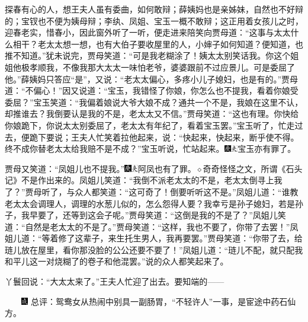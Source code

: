 探春有心的人，想王夫人虽有委曲，如何敢辩；薛姨妈也是亲姊妹，自然也不好辩的；宝钗也不便为姨母辩；李纨、凤姐、宝玉一概不敢辩；这正用着女孩儿之时，迎春老实，惜春小，因此窗外听了一听，便走进来陪笑向贾母道：“这事与太太什么相干？老太太想一想，也有大伯子要收屋里的人，小婶子如何知道？便知道，也推不知道。”犹未说完，贾母笑道：“可是我老糊涂了！姨太太别笑话我。你这个姐姐他极孝顺我，不像我那大太太一味怕老爷，婆婆跟前不过应景儿。可是委屈了他。”薛姨妈只答应“是”，又说：“老太太偏心，多疼小儿子媳妇，也是有的。”贾母道：“不偏心！”因又说道：“宝玉，我错怪了你娘，你怎么也不提我，看着你娘受委屈？”宝玉笑道：“我偏着娘说大爷大娘不成？通共一个不是，我娘在这里不认，却推谁去？我倒要认是我的不是，老太太又不信。”贾母笑道：“这也有理。你快给你娘跪下，你说太太别委屈了，老太太有年纪了，看着宝玉罢。”宝玉听了，忙走过去，便跪下要说；王夫人忙笑着拉他起来，说：“快起来，快起来，断乎使不得。终不成你替老太太给我赔不是不成？”宝玉听说，忙站起来。{\includegraphics[width=3mm]{../Images/00004}\includegraphics[width=3mm]{../Images/00012}\footnotesize \kaishu 宝玉亦有罪了。}

贾母又笑道：“凤姐儿也不提我。”{\includegraphics[width=3mm]{../Images/00004}\includegraphics[width=3mm]{../Images/00012}\footnotesize \kaishu 阿凤也有了罪。{$\diamond$}奇奇怪怪之文，所谓《石头记》不是作出来的。}凤姐儿笑道：“我倒不派老太太的不是，老太太倒寻上我了？”贾母听了，与众人都笑道：“这可奇了！倒要听听这不是。”凤姐儿道：“谁教老太太会调理人，调理的水葱儿似的，怎么怨得人要？我幸亏是孙子媳妇，若是孙子，我早要了，还等到这会子呢。”贾母笑道：“这倒是我的不是了？”凤姐儿笑道：“自然是老太太的不是了。”贾母笑道：“这样，我也不要了，你带了去罢！”凤姐儿道：“等着修了这辈子，来生托生男人，我再要罢。”贾母笑道：“你带了去，给琏儿放在屋里，看你那没脸的公公还要不要了！”凤姐儿道：“琏儿不配，就只配我和平儿这一对烧糊了的卷子和他混罢。”说的众人都笑起来了。

丫鬟回说：“大太太来了。”王夫人忙迎了出去。要知端的------

{　　\includegraphics[width=3mm]{../Images/00005} \kaishu 总评：鸳鸯女从热闹中别具一副肠胃，“不轻许人”一事，是宦途中药石仙方。}

